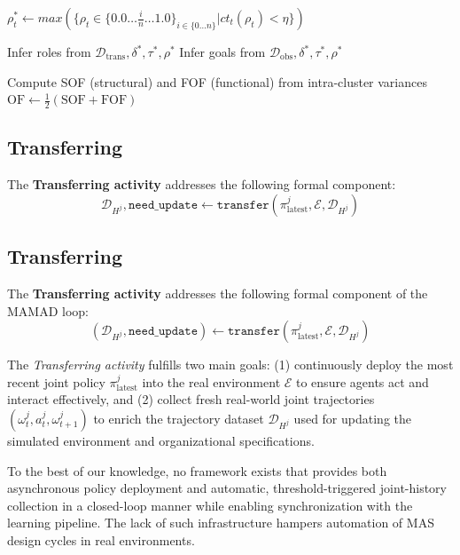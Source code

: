 \documentclass[pdflatex,sn-mathphys-num]{sn-jnl}%
\theoremstyle{thmstyleone}%
\theoremstyle{thmstyletwo}%
\theoremstyle{thmstylethree}%
\begin{document}
\begin{algorithm}[H]
{        
        $\rho_t^* \gets max(\{\rho_t \in \{0.0\dots\frac{i}{n}\dots1.0\}_{i \in \{0\dots n\}} | ct_t(\rho_t) < \eta \})$ 

    }

    Infer roles from $\mathcal{D}_{\text{trans}}, \delta^*, \tau^*, \rho^*$ \;
    Infer goals from $\mathcal{D}_{\text{obs}}, \delta^*, \tau^*, \rho^*$ \;

    Compute SOF (structural) and FOF (functional) from intra-cluster variances \;
    $\text{OF} \gets \frac{1}{2}(\text{SOF} + \text{FOF})$ \;

\end{algorithm}


\subsection{Transferring}\label{sec:transferring}

\noindent The \textbf{Transferring activity} addresses the following formal component:
\[
\mathcal{D}_{H^j}, \texttt{need\_update} \gets \texttt{transfer}(\pi^j_{\text{latest}}, \mathcal{E}, \mathcal{D}_{H^j})
\]


\subsection{Transferring}\label{sec:transferring}

The \textbf{Transferring activity} addresses the following formal component of the MAMAD loop:
\[
    (\mathcal{D}_{H^j}, \texttt{need\_update}) \gets \texttt{transfer}(\pi^j_{\text{latest}}, \mathcal{E}, \mathcal{D}_{H^j})
\]

The \textit{Transferring activity} fulfills two main goals: (1) continuously deploy the most recent joint policy $\pi^j_{\text{latest}}$ into the real environment $\mathcal{E}$ to ensure agents act and interact effectively, and (2) collect fresh real-world joint trajectories $(\omega^j_t, a^j_t, \omega^j_{t+1})$ to enrich the trajectory dataset $\mathcal{D}_{H^j}$ used for updating the simulated environment and organizational specifications.

To the best of our knowledge, no framework exists that provides both asynchronous policy deployment and automatic, threshold-triggered joint-history collection in a closed-loop manner while enabling synchronization with the learning pipeline. The lack of such infrastructure hampers automation of MAS design cycles in real environments.
\end{document}
